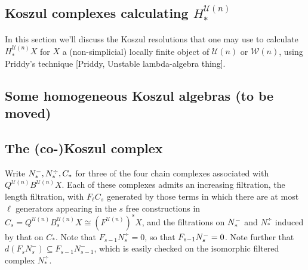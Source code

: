 \documentclass[11pt]{amsart}
\theoremstyle{plain}
\theoremstyle{definition}
\newcommand{\calW}{\mathcal{W}}
\newcommand{\calU}{\mathcal{U}}
\theoremstyle{plain}
\newcommand{\Nop}{N^{\smash{-}}}
\begin{document}
\begin{Koszul complexes}
\vfil\pagebreak

\section{Koszul complexes calculating $H_*^{\calU(n)}$}
In this section we'll discuss the Koszul resolutions that one may use to calculate $H_*^{\calU(n)}X$ for $X$ a (non-simplicial) locally finite object of $\calU(n)$ or $\calW(n)$, using Priddy's technique [Priddy, Unstable lambda-algebra thing].
\subsection{Some homogeneous Koszul algebras (to be moved)}
\hfil
{}

\subsection{The (co-)Koszul complex}
Write $\Nop_*,N_*^\div,C_*$ for three of the four chain complexes associated with $Q^{\calU(n)}B^{\calU(n)}X$. Each of these complexes admits an increasing filtration, the length filtration, with $F_\ell C_s$ generated by those terms in which there are at most $\ell$ generators appearing in the $s$ free constructions in $C_s= Q^{\calU(n)}B^{\calU(n)}_sX\cong (F^{\calU(n)})^sX$, and the filtrations on $\Nop_*$ and $N^\div_*$ induced by that on $C_*$. Note that $F_{s-1}N^\div_s=0$, so that  $F_{s-1}\Nop_s=0$. Note further that $d(F_sN_s^-)\subseteq F_{s-1}N_{s-1}^-$, which is easily checked on the isomorphic filtered complex $N_*^\div$.


\end{Koszul complexes}
\end{document}
